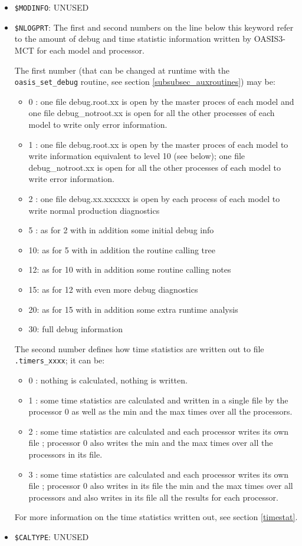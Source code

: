 \begin{itemize}
\item {\tt \$MODINFO}: UNUSED
 
\item {\tt \$NLOGPRT}: The first and second numbers on the line below
  this keyword refer to the amount of debug and time statistic
  information written by OASIS3-MCT for each model and processor.

  The first number (that can be changed at runtime with the {\tt
    oasis\_set\_debug} routine, see section
  \ref{subsubsec_auxroutines}) may be:
  \begin{itemize}
  \item 0 : one file debug.root.xx is open by the master proces of
    each model and one file debug\_notroot.xx is open for all the
    other processes of each model to write only error information.
  \item 1 : one file debug.root.xx is open by the master proces of
    each model to write information equivalent to level 10 (see
    below); one file debug\_notroot.xx is open for all the other
    processes of each model to write error information.
  \item 2 : one file debug.xx.xxxxxx is open by each process of each
    model to write normal production diagnostics
  \item 5 : as for 2 with in addition some initial debug info
  \item 10: as for 5 with in addition the routine calling tree
  \item 12: as for 10 with in addition some routine calling notes
  \item 15: as for 12 with even more debug diagnostics
  \item 20: as for 15 with in addition some extra runtime analysis
  \item 30: full debug information
  \end{itemize}
  The second number defines how time statistics are written out to
  file {\tt *.timers\_xxxx}; it can be:
  \begin{itemize}
  \item 0 : nothing is calculated, nothing is written.
  \item 1 : some time statistics are calculated and written in a
    single file by the processor 0 as well as the min and the max
    times over all the processors.
  \item 2 : some time statistics are calculated and each processor
    writes its own file ; processor 0 also writes the min and the max
    times over all the processors in its file.
  \item 3 : some time statistics are calculated and each processor
    writes its own file ; processor 0 also writes in its file the min
    and the max times over all processors and also writes in its file
    all the results for each processor.
  \end{itemize}
  For more information on the time statistics written out, see section
  \ref{timestat}.

\item {\tt \$CALTYPE}: UNUSED

\end{itemize}

